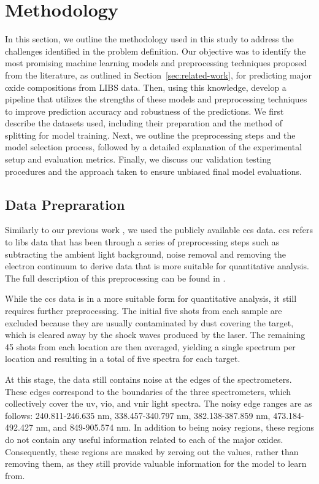 \section{Methodology}\label{sec:methodology}
In this section, we outline the methodology used in this study to address the challenges identified in the problem definition. Our objective was to identify the most promising machine learning models and preprocessing techniques proposed from the literature, as outlined in Section~\ref{sec:related-work}, for predicting major oxide compositions from LIBS data.
Then, using this knowledge, develop a pipeline that utilizes the strengths of these models and preprocessing techniques to improve prediction accuracy and robustness of the predictions.
We first describe the datasets used, including their preparation and the method of splitting for model training. Next, we outline the preprocessing steps and the model selection process, followed by a detailed explanation of the experimental setup and evaluation metrics. Finally, we discuss our validation testing procedures and the approach taken to ensure unbiased final model evaluations.

\subsection{Data Prepraration}
Similarly to our previous work \citet{p9_paper}, we used the publicly available \gls{ccs} data.
\gls{ccs} refers to \gls{libs} data that has been through a series of preprocessing steps such as subtracting the ambient light background, noise removal and removing the electron continuum to derive data that is more suitable for quantitative analysis.
The full description of this preprocessing can be found in \citet{wiensPreFlight3}.

While the \gls{ccs} data is in a more suitable form for quantitative analysis, it still requires further preprocessing.
The initial five shots from each sample are excluded because they are usually contaminated by dust covering the target, which is cleared away by the shock waves produced by the laser.
The remaining 45 shots from each location are then averaged, yielding a single spectrum per location and resulting in a total of five spectra for each target.

At this stage, the data still contains noise at the edges of the spectrometers.
These edges correspond to the boundaries of the three spectrometers, which collectively cover the \gls{uv}, \gls{vio}, and \gls{vnir} light spectra.
The noisy edge ranges are as follows: 240.811-246.635 nm, 338.457-340.797 nm, 382.138-387.859 nm, 473.184-492.427 nm, and 849-905.574 nm.
In addition to being noisy regions, these regions do not contain any useful information related to each of the major oxides.
Consequently, these regions are masked by zeroing out the values, rather than removing them, as they still provide valuable information for the model to learn from\cite{cleggRecalibrationMarsScience2017}.

